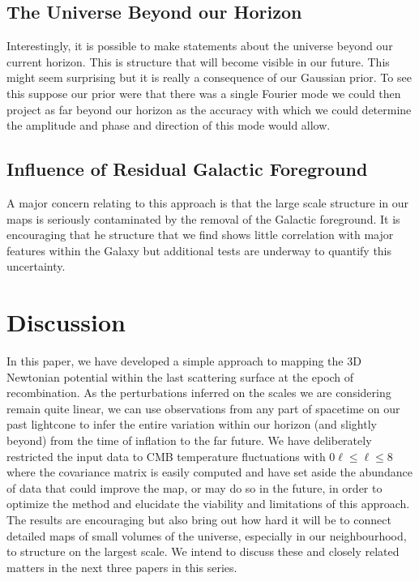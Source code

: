\documentclass[useAMS,usenatbib,a4paper]{mn2e}
\begin{document}
\subsection{The Universe Beyond our Horizon}

Interestingly, it is possible to make statements about the universe
beyond our current horizon. This is structure that will become visible
in our future. This might seem surprising but it is really a
consequence of our Gaussian prior. To see this suppose our prior were
that there was a single Fourier mode we could then project as far
beyond our horizon as the accuracy with which we could determine the
amplitude and phase and direction of this mode would allow.

\subsection{Influence of Residual Galactic Foreground}

A major concern relating to this approach is that the large scale
structure in our maps is seriously contaminated by the removal of the
Galactic foreground. It is encouraging that he structure that we find
shows little correlation with major features within the Galaxy but
additional tests are underway to quantify this uncertainty.


\section{Discussion}

In this paper, we have developed a simple approach to mapping the 3D
Newtonian potential within  the last scattering surface at the epoch
of recombination. As the perturbations inferred on the scales we are
considering remain quite linear, we can use observations from any part
of spacetime on our past lightcone to infer the entire variation
within our horizon (and slightly beyond) from the time of inflation to
the far future. We have deliberately restricted the input data to CMB
temperature fluctuations with $0\ell\leq\ell\leq8$ where the
covariance matrix is easily computed and have set aside the abundance
of data that could improve the map, or may do so in the future, in
order to optimize the method and elucidate the viability and
limitations of this approach. The results are encouraging but also
bring out how hard it will be to connect detailed maps of small
volumes of the universe, especially in our neighbourhood, to structure
on the largest scale. We intend to discuss these and closely related
matters in the next three papers in this series.
\end{document}
